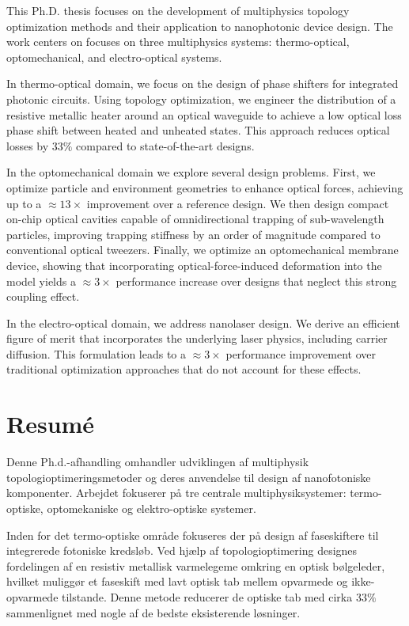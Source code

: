 This Ph.D. thesis focuses on the development of multiphysics topology optimization methods and their application to nanophotonic device design. The work centers on focuses on three multiphysics systems: thermo-optical, optomechanical, and electro-optical systems.

In thermo-optical domain, we focus on the design of phase shifters for integrated photonic circuits. Using topology optimization, we engineer the distribution of a resistive metallic heater around an optical waveguide to achieve a low optical loss phase shift between heated and unheated states. This approach reduces optical losses by $33\%$ compared to state-of-the-art designs.

In the optomechanical domain we explore several design problems. First, we optimize particle and environment geometries to enhance optical forces, achieving up to a $\approx 13 \times$ improvement over a reference design. We then design compact on-chip optical cavities capable of omnidirectional trapping of sub-wavelength particles, improving trapping stiffness by an order of magnitude compared to conventional optical tweezers. Finally, we optimize an optomechanical membrane device, showing that incorporating optical-force-induced deformation into the model yields a $\approx 3 \times$ performance increase over designs that neglect this strong coupling effect.

In the electro-optical domain, we address nanolaser design. We derive an efficient figure of merit that incorporates the underlying laser physics, including carrier diffusion. This formulation leads to a $\approx 3\times$ performance improvement over traditional optimization approaches that do not account for these effects.

\chapter*{Resumé}

Denne Ph.d.-afhandling omhandler udviklingen af multiphysik topologioptimeringsmetoder og deres anvendelse til design af nanofotoniske komponenter. Arbejdet fokuserer på tre centrale multiphysiksystemer: termo-optiske, optomekaniske og elektro-optiske systemer.

Inden for det termo-optiske område fokuseres der på design af faseskiftere til integrerede fotoniske kredsløb. Ved hjælp af topologioptimering designes fordelingen af en resistiv metallisk varmelegeme omkring en optisk bølgeleder, hvilket muliggør et faseskift med lavt optisk tab mellem opvarmede og ikke-opvarmede tilstande. Denne metode reducerer de optiske tab med cirka $33\%$ sammenlignet med nogle af de bedste eksisterende løsninger.

